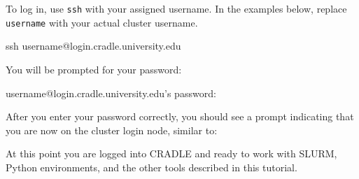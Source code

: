 \documentclass[11pt]{article}
\begin{document}
To log in, use \texttt{ssh} with your assigned username. In the
examples below, replace \texttt{username} with your actual cluster username.

\begin{codeblock}
ssh username@login.cradle.university.edu
\end{codeblock}

You will be prompted for your password:

\begin{codeblock}
username@login.cradle.university.edu's password:
\end{codeblock}

After you enter your password correctly, you should see a prompt indicating
that you are now on the cluster login node, similar to:



At this point you are logged into CRADLE and ready to work with SLURM, Python
environments, and the other tools described in this tutorial.
\end{document}
